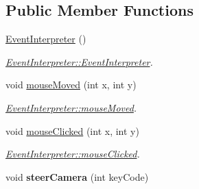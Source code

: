 \subsection*{Public Member Functions}
\begin{DoxyCompactItemize}
\item 
\hyperlink{classEventInterpreter_ada70531370606873ff55e29a923a9096}{Event\-Interpreter} ()
\begin{DoxyCompactList}\small\item\em \hyperlink{classEventInterpreter_ada70531370606873ff55e29a923a9096}{Event\-Interpreter\-::\-Event\-Interpreter}. \end{DoxyCompactList}\item 
void \hyperlink{classEventInterpreter_ad99704356fcdfbaa5982e463a6a27318}{mouse\-Moved} (int x, int y)
\begin{DoxyCompactList}\small\item\em \hyperlink{classEventInterpreter_ad99704356fcdfbaa5982e463a6a27318}{Event\-Interpreter\-::mouse\-Moved}. \end{DoxyCompactList}\item 
void \hyperlink{classEventInterpreter_a74690162262290d519369630015f6cef}{mouse\-Clicked} (int x, int y)
\begin{DoxyCompactList}\small\item\em \hyperlink{classEventInterpreter_a74690162262290d519369630015f6cef}{Event\-Interpreter\-::mouse\-Clicked}. \end{DoxyCompactList}\item 
\hypertarget{classEventInterpreter_aa977815c55a5eb97577aa5d1e73379cb}{void {\bfseries steer\-Camera} (int key\-Code)}\label{classEventInterpreter_aa977815c55a5eb97577aa5d1e73379cb}


\end{DoxyCompactItemize}
